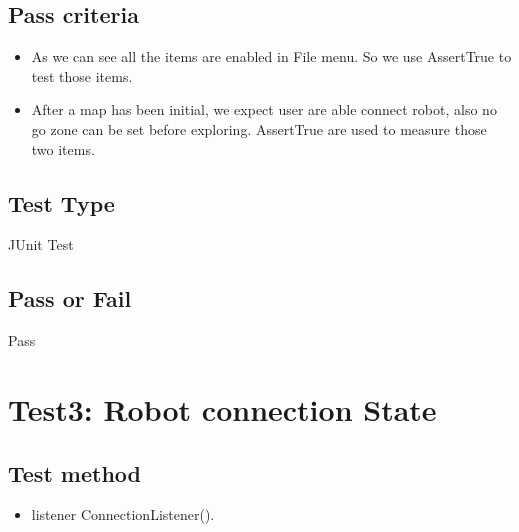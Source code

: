 \documentclass[11pt, a4paper]{report}
\begin{document}
\subsection{Pass criteria}
\begin{itemize}
\item As we can see all the items are enabled in File menu. So we use AssertTrue to test those items.
\item After a map has been initial, we expect user are able connect robot, also no go zone can be set before exploring. AssertTrue are used to measure those two items.
\end{itemize}
\subsection{Test Type}
JUnit Test
\subsection{Pass or Fail}
Pass
\section{Test3: Robot connection State}
\subsection{Test method}
\begin{itemize}
\item listener ConnectionListener().
\end{itemize}
\end{document}
